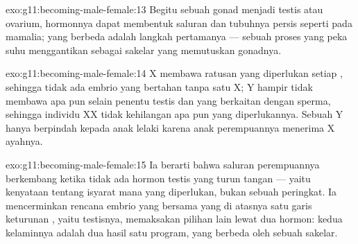 \begin{solution}{exo:g11:becoming-male-female:13}
Begitu sebuah gonad menjadi testis atau ovarium, hormonnya dapat
membentuk saluran dan tubuhnya persis seperti pada mamalia; yang
berbeda adalah langkah pertamanya --- sebuah proses yang peka suhu
menggantikan  sebagai sakelar yang memutuskan gonadnya.
\end{solution}

\begin{solution}{exo:g11:becoming-male-female:14}
 X membawa ratusan  yang diperlukan setiap , sehingga
tidak ada embrio yang bertahan tanpa satu X;  Y hampir tidak
membawa apa pun selain  penentu testis dan  yang berkaitan dengan
sperma, sehingga individu XX tidak kehilangan apa pun yang
diperlukannya. Sebuah Y hanya berpindah kepada anak lelaki karena anak
perempuannya menerima  X ayahnya.
\end{solution}

\begin{solution}{exo:g11:becoming-male-female:15}
Ia berarti bahwa saluran perempuannya berkembang ketika tidak ada
hormon testis yang turun tangan --- yaitu kenyataan tentang isyarat
mana yang diperlukan, bukan sebuah peringkat. Ia mencerminkan rencana
embrio yang bersama yang di atasnya satu garis keturunan , yaitu
testisnya, memaksakan pilihan lain lewat dua hormon: kedua kelaminnya
adalah dua hasil satu program, yang berbeda oleh sebuah sakelar.
\end{solution}

